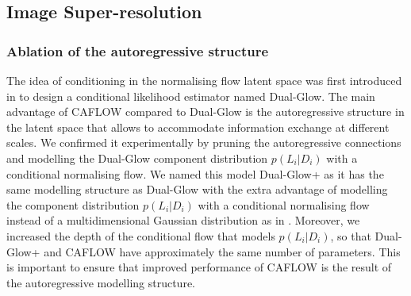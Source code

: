 \subsection{Image Super-resolution}
\subsubsection{Ablation of the autoregressive structure}
The idea of conditioning in the normalising flow latent space was first introduced in \cite{Dual-Glow} to design a conditional likelihood estimator named Dual-Glow. 
The main advantage of CAFLOW compared to Dual-Glow is the autoregressive structure in the latent space that allows to accommodate information exchange at different scales. We confirmed it experimentally by pruning the autoregressive connections and modelling the Dual-Glow component distribution $p(L_i|D_i)$ with a conditional normalising flow. We named this model Dual-Glow+ as it has the same modelling structure as Dual-Glow with the extra advantage of modelling the component distribution $p(L_i|D_i)$ with a conditional normalising flow instead of a multidimensional Gaussian distribution as in  \cite{Dual-Glow}. Moreover, we increased the depth of the conditional flow that models $p(L_i|D_i)$, so that Dual-Glow+ and CAFLOW have approximately the same number of parameters. This is important to ensure that improved performance of CAFLOW is the result of the autoregressive modelling structure.

